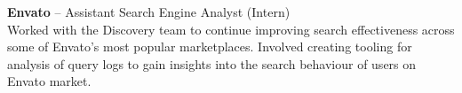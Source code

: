 \documentclass[line]{res}
\begin{document}
\begin{resume}

                    {\bf Envato} -- Assistant Search Engine Analyst (Intern)\hfill {}\\
                    Worked with the Discovery team to continue improving search effectiveness across some of Envato's most popular marketplaces. Involved creating tooling for analysis of query logs to gain insights into the search behaviour
of users on Envato market.

%

\end{resume}
\end{document}
